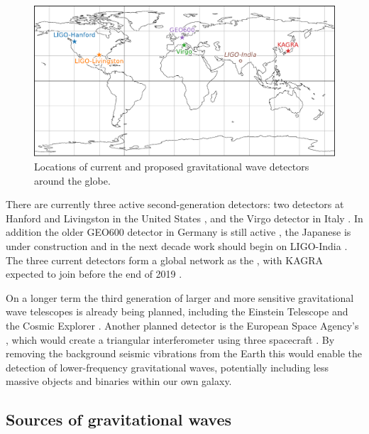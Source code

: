 \begin{colsection}
\begin{colsection}
\begin{figure}[t]
    \begin{center}
        \includegraphics[width=0.9\linewidth]{images/global.pdf}
    \end{center}
    \caption[Locations of gravitational wave detectors]{
        Locations of current and proposed gravitational wave detectors around the globe.
        }\label{fig:global}
\end{figure}

There are currently three active second-generation detectors: two  detectors at Hanford and Livingston in the United States \citep{LIGO}, and the  Virgo detector in Italy \citep{Virgo}. In addition the older GEO600 detector in Germany is still active \citep{GEO600}, the Japanese  is under construction \citep{KAGRA} and in the next decade work should begin on LIGO-India \citep{LIGO_India}. The three current detectors form a global network as the , with KAGRA expected to join before the end of 2019 \citep{LIGO-Virgo, LIGO-Virgo-KAGRA}.

On a longer term the third generation of larger and more sensitive gravitational wave telescopes is already being planned, including the Einstein Telescope \citep{EinsteinTelescope} and the Cosmic Explorer \citep{CosmicExplorer}. Another planned detector is the European Space Agency's , which would create a triangular interferometer using three spacecraft \citep{LISA}. By removing the background  seismic vibrations from the Earth this would enable the detection of lower-frequency gravitational waves, potentially including less massive objects and binaries within our own galaxy.

\newpage

\end{colsection}


\subsection{Sources of gravitational waves}
\label{sec:gw_sources}
\begin{colsection}


\end{colsection}
\end{colsection}
